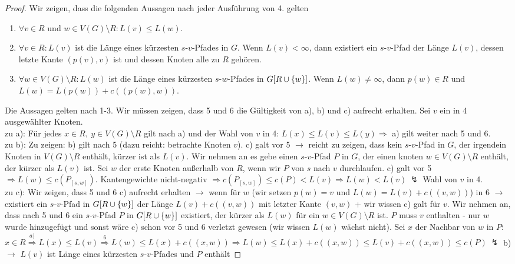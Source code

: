 \begin{proof}
	Wir zeigen, dass die folgenden Aussagen nach jeder Ausführung von 4. gelten
	\begin{enumerate}[label=\alph*)]
		\item $\forall v\in R$ und $w\in V(G)\setminus R: L(v) \le L(w)$.
		\item $\forall v\in R: L(v)$ ist die Länge eines kürzesten $s$-$v$-Pfades in $G$. Wenn $L(v) < \infty$, dann existiert ein $s$-$v$-Pfad der Länge $L(v)$, dessen letzte Kante $(p(v), v)$ ist und dessen Knoten alle zu $R$ gehören.
		\item $\forall w\in V(G)\setminus R: L(w)$ ist die Länge eines kürzesten $s$-$w$-Pfades in $G[R\cup \{w\}]$. Wenn $L(w) \neq \infty$, dann $p(w)\in R$ und $L(w) = L(p(w)) + c((p(w),w))$.
	\end{enumerate}
	Die Aussagen gelten nach 1-3. Wir müssen zeigen, dass 5 und 6 die Gültigkeit von a), b) und c) aufrecht erhalten. Sei $v$ ein in 4 ausgewählter Knoten.\\
	zu a): Für jedes $x \in R,~y\in V(G)\setminus R$ gilt nach a) und der Wahl von $v$ in 4: $L(x) \le L(v) \le L(y) \Rightarrow$ a) gilt weiter nach 5 und 6.\\
	zu b): Zu zeigen: b) gilt nach 5 (dazu reicht: betrachte Knoten $v$). c) galt vor 5 $\to$ reicht zu zeigen, dass kein $s$-$v$-Pfad in $G$, der irgendein Knoten in $V(G)\setminus R$ enthält, kürzer ist als $L(v)$. Wir nehmen an es gebe einen $s$-$v$-Pfad $P$ in $G$, der einen knoten $w \in V(G)\setminus R$ enthält, der kürzer als $L(v)$ ist. Sei $w$ der erste Knoten außerhalb von $R$, wenn wir $P$ von $s$ nach $v$ durchlaufen. c) galt vor 5 $\Rightarrow L(w) \le c(P_{[s,w]})$. Kantengewichte nicht-negativ $\Rightarrow c(P_{[s,w]}) \le c(P) < L(v) \Rightarrow L(w) < L(v)~ \lightning$ Wahl von $v$ in 4.\\
	zu c): Wir zeigen, dass 5 und 6 c) aufrecht erhalten $\to$ wenn für $w$ (wir setzen $p(w) = v$ und $L(w) = L(v) + c((v,w))$) in 6 $\to$ existiert ein $s$-$v$-Pfad in $G[R \cup \{w\}]$ der Länge $L(v) + c((v,w))$ mit letzter Kante $(v,w)$ + wir wissen c) galt für $v$. Wir nehmen an, dass nach 5 und 6 ein $s$-$v$-Pfad $P$ in $G[R \cup \{w\}]$ existiert, der kürzer als $L(w)$ für ein $w\in V(G)\setminus R$ ist. $P$ muss $v$ enthalten - nur $w$ wurde hinzugefügt und sonst wäre c) schon vor 5 und 6 verletzt gewesen (wir wissen $L(w)$ wächst nicht). Sei $x$ der Nachbar von $w$ in $P$: $x \in R \overset{a)}{\Rightarrow} L(x) \le L(v) \overset{6}{\Rightarrow} L(w) \le L(x) + c((x,w)) \Rightarrow L(w) \le L(x) + c((x,w)) \le L(v) + c((x,w)) \le c(P) ~\lightning$ b) $\to$ $L(v)$ ist Länge eines kürzesten $s$-$v$-Pfades und $P$ enthält

\end{proof}
